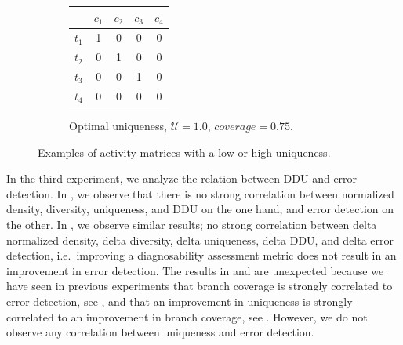 \documentclass[twoside,a4paper,11pt]{memoir}
\begin{document}
\begin{figure}
\begin{subfigure}[b]{0.49\linewidth}
    \end{subfigure}
    \hfill
    \begin{subfigure}[b]{0.49\linewidth}
        \centering
        \begin{tabular}{c|cccc}
          & \(c_1 \) & \(c_2 \) & \(c_3 \) & \(c_4 \)     \\ \hline
          \(t_1 \) & 1 & 0 & 0 & 0 \\
          \(t_2 \) & 0 & 1 & 0 & 0 \\
          \(t_3 \) & 0 & 0 & 1 & 0 \\
          \(t_4 \) & 0 & 0 & 0 & 0 \\
        \end{tabular}
        \caption{Optimal uniqueness, \(\mathcal{U}=1.0 \), \(coverage = 0.75 \).}%
        \label{subfig:optimal_uniqueness}
    \end{subfigure}
    \caption{Examples of activity matrices with a low or high uniqueness.}
\end{figure}

In the third experiment, we analyze the relation between DDU and error detection.
In , we observe that there is no strong correlation between normalized density, diversity, uniqueness, and DDU on the one hand, and error detection on the other.
In , we observe similar results; no strong correlation between delta normalized density, delta diversity, delta uniqueness, delta DDU, and delta error detection, i.e.\ improving a diagnosability assessment metric does not result in an improvement in error detection.
The results in  and  are unexpected because we have seen in previous experiments that branch coverage is strongly correlated to error detection, see , and that an improvement in uniqueness is strongly correlated to an improvement in branch coverage, see .
However, we do not observe any correlation between uniqueness and error detection.
\end{document}

